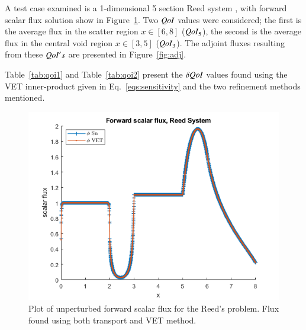 \documentclass{anstrans}
\newcommand{\qoi}{{\it QoI}\xspace}
\begin{document}
A test case examined is a 1-dimensional 5 section Reed system \cite{ReedProb}, with forward scalar flux solution show in Figure~\ref{fig:Flux4}. Two $\qoi$ values were considered; the first is the average flux in the scatter region $x\in[6,8]$ ($\qoi_5$), the second is the average flux in the central void region $x\in[3,5]$ ($\qoi_3$). The adjoint fluxes resulting from these $\qoi's$ are presented in Figure~\ref{fig:adj}.

Table~\ref{tab:qoi1} and Table~\ref{tab:qoi2} present the $\delta \qoi$ values found using the VET inner-product given in Eq.~\eqref{eqs:sensitivity} and the two refinement methods mentioned.



\begin{figure}
\centering
 \includegraphics[scale=0.5]{7phi.png}
 \caption{Plot of unperturbed forward scalar flux for the Reed's problem. Flux found using both transport and VET method.}
\label{fig:Flux4}
\end{figure}
\end{document}
